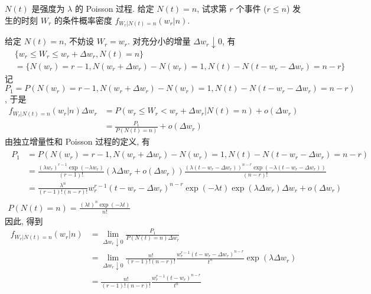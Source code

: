 \documentclass[boxes]{homework}
\begin{document}
\begin{problem}
    $N(t)$ 是强度为 $\lambda$ 的 Poisson 过程. 给定 $N(t) = n$, 试求第 $r$ 个事件 ($r\leq n$) 发生的时刻 $W_r$ 的条件概率密度 $f_{W_r\vert N(t)=n}(w_r\vert n)$.
\end{problem}
\begin{solution}
    给定 $N(t) = n$, 不妨设 $W_r = w_r$. 对充分小的增量 $\Delta w_r\downarrow0$, 有
    \begin{equation}
        \begin{aligned}
            &\{w_r\leq W_r\leq w_r+\Delta w_r, N(t) = n\} \\
            &= \{N(w_r) = r-1, N(w_r+\Delta w_r)-N(w_r) = 1, N(t) - N(t - w_r - \Delta w_r) = n - r\}
        \end{aligned}
    \end{equation}
    记 $P_1 = P(N(w_r) = r-1, N(w_r+\Delta w_r)-N(w_r) = 1, N(t) - N(t - w_r - \Delta w_r) = n - r)$, 于是
    \begin{equation}
        \begin{aligned}
            f_{W_r\vert N(t)=n}(w_r\vert n)\Delta w_r &= P(w_r\leq W_r< w_r + \Delta w_r\vert N(t)=n) + o(\Delta w_r)\\
            &= \frac{P_1}{P(N(t) = n)} + o(\Delta w_r)
        \end{aligned}
    \end{equation}
    由独立增量性和 Poisson 过程的定义, 有
    \begin{gather}
        \begin{aligned}
            P_1 &= P(N(w_r) = r-1, N(w_r+\Delta w_r)-N(w_r) = 1, N(t) - N(t - w_r - \Delta w_r) = n - r)\\
            &= \frac{(\lambda w_r)^{r - 1}\exp(-\lambda w_r)}{(r - 1)!}(\lambda \Delta w_r + o(\Delta w_r))\frac{(\lambda (t - w_r - \Delta w_r))^{n - r}\exp(-\lambda (t - w_r - \Delta w_r))}{(n - r)!}\\
            &= \frac{\lambda^n}{(r-1)!(n-r)!}w_r^{r-1}(t - w_r - \Delta w_r)^{n - r}\exp(-\lambda t)\exp(\lambda \Delta w_r)\Delta w_r + o(\Delta w_r)
        \end{aligned}\\
        P(N(t) = n) = \frac{(\lambda t)^n\exp(-\lambda t)}{n!}
    \end{gather}
    因此, 得到
    \begin{equation}
        \begin{aligned}
            f_{W_r\vert N(t)=n}(w_r\vert n) &= \lim_{\Delta w_r\downarrow 0} \frac{P_1}{P(N(t) = n)\Delta w_r}\\
            &= \lim_{\Delta w_r\downarrow 0} \frac{n!}{(r-1)!(n-r)!}\frac{w_r^{r-1}(t - w_r - \Delta w_r)^{n - r}}{t^n}\exp(\lambda \Delta w_r)\\
            &= \frac{n!}{(r-1)!(n-r)!}\frac{w_r^{r-1}(t - w_r)^{n - r}}{t^n}
        \end{aligned}
    \end{equation}
\end{solution}
\end{document}

